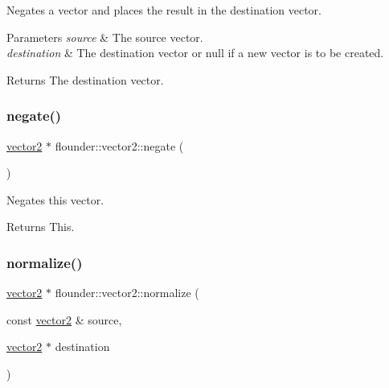 Negates a vector and places the result in the destination vector. 


\begin{DoxyParams}{Parameters}
{\em source} & The source vector. \\
\hline
{\em destination} & The destination vector or null if a new vector is to be created. \\
\hline
\end{DoxyParams}
\begin{DoxyReturn}{Returns}
The destination vector. 
\end{DoxyReturn}
\mbox{\label{classflounder_1_1vector2_a0fa7eef12302eaa8cd4f4ff030231e3d}} 
\subsubsection{\texorpdfstring{negate()}{negate()}\hspace{0.1cm}{\footnotesize\ttfamily [2/2]}}
{\footnotesize\ttfamily \hyperlink{classflounder_1_1vector2}{vector2} $\ast$ flounder\+::vector2\+::negate (\begin{DoxyParamCaption}{ }\end{DoxyParamCaption})}



Negates this vector. 

\begin{DoxyReturn}{Returns}
This. 
\end{DoxyReturn}
\mbox{\label{classflounder_1_1vector2_ac1bae04e41daf4ba46ae125db1c0b2b0}} 
\subsubsection{\texorpdfstring{normalize()}{normalize()}\hspace{0.1cm}{\footnotesize\ttfamily [1/2]}}
{\footnotesize\ttfamily \hyperlink{classflounder_1_1vector2}{vector2} $\ast$ flounder\+::vector2\+::normalize (\begin{DoxyParamCaption}\item[{const \hyperlink{classflounder_1_1vector2}{vector2} \&}]{source,  }\item[{\hyperlink{classflounder_1_1vector2}{vector2} $\ast$}]{destination }\end{DoxyParamCaption})\hspace{0.3cm}{\ttfamily [static]}}



